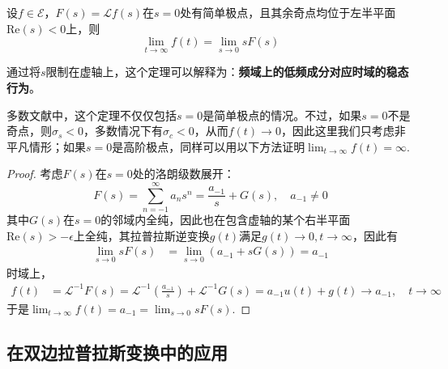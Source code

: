 \begin{theorem}[终值定理]
    \label{thm:final_value}
    设$f\in\mathcal{E} $，$F(s)=\mathcal{L} f(s)$在$s=0$处有简单极点，且其余奇点均位于左半平面$\mathrm{Re}(s)<0$上，则
    \[\lim_{t\to\infty}f(t)=\lim_{s\to 0}sF(s)\]
\end{theorem}
通过将$s$限制在虚轴上，这个定理可以解释为：\textbf{频域上的低频成分对应时域的稳态行为}。
\begin{remark}
多数文献中，这个定理不仅仅包括$s=0$是简单极点的情况。不过，如果$s=0$不是奇点，则$\sigma_s<0$，多数情况下有$\sigma_c<0$，从而$f(t)\to 0$，因此这里我们只考虑非平凡情形；如果$s=0$是高阶极点，同样可以用以下方法证明$\lim_{t\to\infty}f(t)=\infty$.
\end{remark}
\begin{proof}
    考虑$F(s)$在$s=0$处的洛朗级数展开：
    \[F(s)=\sum_{n=-1}^{\infty}a_n s^n=\frac{a_{-1}}{s}+G(s),\quad a_{-1}\neq 0\]
    其中$G(s)$在$s=0$的邻域内全纯，因此也在包含虚轴的某个右半平面$\mathrm{Re}(s)>-\epsilon$上全纯，其拉普拉斯逆变换$g(t)$满足$g(t)\to 0,t\to\infty$，因此有\begin{align*}
        \lim_{s\to 0}sF(s)&=\lim_{s\to 0}\left(a_{-1}+sG(s)\right)=a_{-1}
    \end{align*}
    时域上，\begin{align*}
        f(t)&=\mathcal{L}^{-1} F(s)=\mathcal{L}^{-1}\left(\frac{a_{-1}}{s}\right)+\mathcal{L}^{-1} G(s)=a_{-1}u(t)+g(t)\to a_{-1},\quad t\to\infty
    \end{align*}
    于是$\lim_{t\to\infty}f(t)=a_{-1}=\lim_{s\to 0}sF(s)$.
\end{proof}

\subsection{在双边拉普拉斯变换中的应用}\label{sub:bilateral_laplace}

